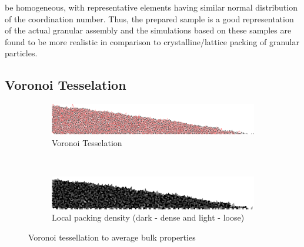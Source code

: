 be 
homogeneous, with representative elements having similar normal distribution of 
the coordination 
number. Thus, the prepared sample is a good representation of the actual 
granular assembly and the 
simulations based on these samples are found to be more realistic in comparison 
to 
crystalline/lattice packing of granular particles. 

\subsection{Voronoi Tesselation}
\begin{figure}[tbhp]
\centering
\begin{subfigure}[b]{0.95\textwidth}
\centering
\includegraphics[width=\textwidth]{tesselation}
\caption{Voronoi Tesselation}
\label{fig:tesselation}
\end{subfigure}
\\
\begin{subfigure}[b]{0.95\textwidth}
\centering
\includegraphics[width=\textwidth]{local_density}
\caption{Local packing density (dark - dense and light - loose)}
\label{fig:local_density}
\end{subfigure}
\caption{Voronoi tessellation to average bulk properties}
\label{fig:voro}
\end{figure}
